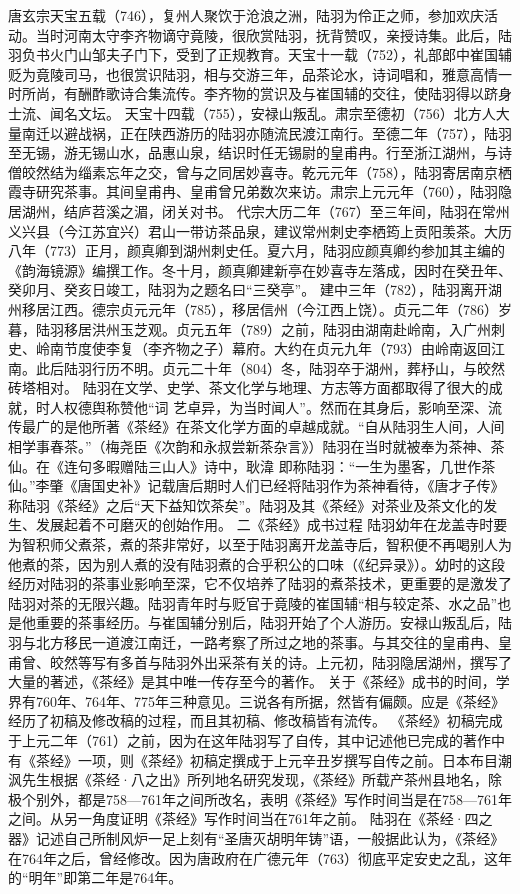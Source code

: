 \documentclass[12pt,UTF8]{ctexbook}
\begin{document}
唐玄宗天宝五载（746），复州人聚饮于沧浪之洲，陆羽为伶正之师，参加欢庆活动。当时河南太守李齐物谪守竟陵，很欣赏陆羽，抚背赞叹，亲授诗集。此后，陆羽负书火门山邹夫子门下，受到了正规教育。天宝十一载（752），礼部郎中崔国辅贬为竟陵司马，也很赏识陆羽，相与交游三年，品茶论水，诗词唱和，雅意高情一时所尚，有酬酢歌诗合集流传。李齐物的赏识及与崔国辅的交往，使陆羽得以跻身士流、闻名文坛。
天宝十四载（755），安禄山叛乱。肃宗至德初（756）北方人大量南迁以避战祸，正在陕西游历的陆羽亦随流民渡江南行。至德二年（757），陆羽至无锡，游无锡山水，品惠山泉，结识时任无锡尉的皇甫冉。行至浙江湖州，与诗僧皎然结为缁素忘年之交，曾与之同居妙喜寺。乾元元年（758），陆羽寄居南京栖霞寺研究茶事。其间皇甫冉、皇甫曾兄弟数次来访。肃宗上元元年（760），陆羽隐居湖州，结庐苕溪之湄，闭关对书。
代宗大历二年（767）至三年间，陆羽在常州义兴县（今江苏宜兴）君山一带访茶品泉，建议常州刺史李栖筠上贡阳羡茶。大历八年（773）正月，颜真卿到湖州刺史任。夏六月，陆羽应颜真卿约参加其主编的《韵海镜源》编撰工作。冬十月，颜真卿建新亭在妙喜寺左落成，因时在癸丑年、癸卯月、癸亥日竣工，陆羽为之题名曰“三癸亭”。
建中三年（782），陆羽离开湖州移居江西。德宗贞元元年（785），移居信州（今江西上饶）。贞元二年（786）岁暮，陆羽移居洪州玉芝观。贞元五年（789）之前，陆羽由湖南赴岭南，入广州刺史、岭南节度使李复（李齐物之子）幕府。大约在贞元九年（793）由岭南返回江南。此后陆羽行历不明。贞元二十年（804）冬，陆羽卒于湖州，葬杼山，与皎然砖塔相对。
陆羽在文学、史学、茶文化学与地理、方志等方面都取得了很大的成就，时人权德舆称赞他“词
艺卓异，为当时闻人”。然而在其身后，影响至深、流传最广的是他所著《茶经》在茶文化学方面的卓越成就。“自从陆羽生人间，人间相学事春茶。”（梅尧臣《次韵和永叔尝新茶杂言》）陆羽在当时就被奉为茶神、茶仙。在《连句多暇赠陆三山人》诗中，耿湋
即称陆羽：“一生为墨客，几世作茶仙。”李肇《唐国史补》记载唐后期时人们已经将陆羽作为茶神看待，《唐才子传》称陆羽《茶经》之后“天下益知饮茶矣”。陆羽及其《茶经》对茶业及茶文化的发生、发展起着不可磨灭的创始作用。
二《茶经》成书过程
陆羽幼年在龙盖寺时要为智积师父煮茶，煮的茶非常好，以至于陆羽离开龙盖寺后，智积便不再喝别人为他煮的茶，因为别人煮的没有陆羽煮的合乎积公的口味（《纪异录》）。幼时的这段经历对陆羽的茶事业影响至深，它不仅培养了陆羽的煮茶技术，更重要的是激发了陆羽对茶的无限兴趣。陆羽青年时与贬官于竟陵的崔国辅“相与较定茶、水之品”也是他重要的茶事经历。与崔国辅分别后，陆羽开始了个人游历。安禄山叛乱后，陆羽与北方移民一道渡江南迁，一路考察了所过之地的茶事。与其交往的皇甫冉、皇甫曾、皎然等写有多首与陆羽外出采茶有关的诗。上元初，陆羽隐居湖州，撰写了大量的著述，《茶经》是其中唯一传存至今的著作。
关于《茶经》成书的时间，学界有760年、764年、775年三种意见。三说各有所据，然皆有偏颇。应是《茶经》经历了初稿及修改稿的过程，而且其初稿、修改稿皆有流传。
《茶经》初稿完成于上元二年（761）之前，因为在这年陆羽写了自传，其中记述他已完成的著作中有《茶经》一项，则《茶经》初稿定撰成于上元辛丑岁撰写自传之前。日本布目潮沨先生根据《茶经·八之出》所列地名研究发现，《茶经》所载产茶州县地名，除极个别外，都是758—761年之间所改名，表明《茶经》写作时间当是在758—761年之间。从另一角度证明《茶经》写作时间当在761年之前。
陆羽在《茶经·四之器》记述自己所制风炉一足上刻有“圣唐灭胡明年铸”语，一般据此认为，《茶经》在764年之后，曾经修改。因为唐政府在广德元年（763）彻底平定安史之乱，这年的“明年”即第二年是764年。
\end{document}
